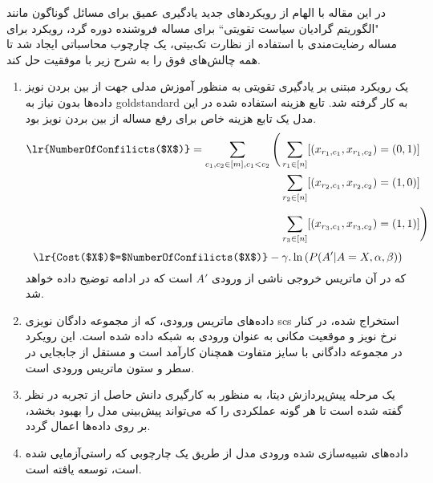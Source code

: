 در این مقاله با الهام از رویکردهای جدید یادگیری عمیق برای مسائل گوناگون مانند "الگوریتم گرادیان سیاست تقویتی`` برای مساله فروشنده دوره گرد\cite{williams1992simple}،  رویکرد  \cite{selsam2018learning} برای مساله رضایت‌مندی با استفاده از نظارت تک‌بیتی، یک چارچوب محاسباتی ایجاد شد تا همه چالش‌های فوق را به شرح زیر با موفقیت حل کند.
\begin{enumerate}
	\item     یک رویکرد مبتنی بر یادگیری تقویتی به منظور آموزش مدلی جهت از بین بردن نویز داده‌ها بدون نیاز به \gls{goldstandard} به کار گرفته شد. تابع هزینه استفاده شده در این مدل یک تابع هزینه خاص برای رفع مساله از بین بردن نویز بود. 
   	\begin{equation}
   		\begin{aligned}
   			\text{\lr{NumberOfConfilicts($X$)}}=\sum_{c_1,c_2 \in [m],c_1<c_2}\Bigg( \sum_{r_1\in [n]} [(x_{r_1,c_1}, x_{r_1, c_2}) &= (0,1)]\\
   			\sum_{r_2\in [n]} [(x_{r_2,c_1}, x_{r_2, c_2}) &= (1,0)] \\
   			\sum_{r_3\in [n]} [(x_{r_3,c_1}, x_{r_3, c_2}) &= (1,1)] \Bigg) 
   		\end{aligned}
   		\label{eq:ch_rw:deepPhylo_3dgamets}
   	\end{equation}
   \begin{equation}
   		\text{\lr{Cost($X$)$=$NumberOfConfilicts($X$)}}-\gamma.\ln\left( P(A'|A=X,\alpha, \beta)\right)
   		\label{eq:ch_rw:deepPhylo_loss}
   	\end{equation}
که در آن  ماتریس خروجی ناشی از ورودی $A'$ است که در ادامه توضیح داده خواهد شد. 
\item     داده‌های ماتریس ورودی، که از مجموعه دادگان نویزی \gls{scs} استخراج شده، در کنار نرخ نویز و موقعیت مکانی به عنوان ورودی به شبکه داده شده است.  این رویکرد در مجموعه دادگانی با سایز متفاوت همچنان کارآمد است و مستقل از جابجایی در سطر و ستون ماتریس ورودی است. 
\item یک مرحله پیش‌پردازش دیتا، به منظور به کارگیری دانش حاصل از تجربه در نظر گفته شده است تا هر گونه عملکردی را  که می‌تواند پیش‌بینی مدل را بهبود بخشد، بر روی داده‌ها اعمال گردد. 
\item داده‌های شبیه‌سازی شده ورودی مدل از طریق یک چارچوبی که راستی‌آزمایی شده است، توسعه یافته است. 
\end{enumerate}

